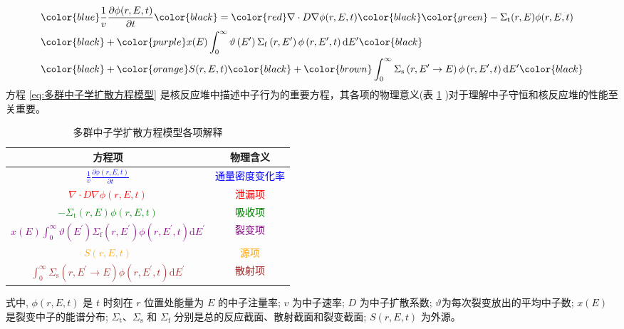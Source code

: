 \documentclass{Sichuan Normal University}
\begin{document}
\begin{equation}
    \begin{aligned}
    & \color{blue}\frac{1}{v} \frac{\partial \phi(r, E, t)}{\partial t} \color{black}= \color{red}\nabla \cdot D \nabla \phi(r, E, t) \color{black} \color{green}- \Sigma_{\mathrm{t}}(r, E) \phi(r, E, t)\\
    & \color{black}+ \color{purple}x(E) \int_0^{\infty} \vartheta\left(E^{\prime}\right) \Sigma_{\mathrm{f}}\left(r, E^{\prime}\right) \phi\left(r, E^{\prime}, t\right) \mathrm{d} E^{\prime} \color{black} \\
    & \color{black}+\color{orange} S(r, E, t) \color{black}+ \color{brown}\int_0^{\infty} \Sigma_{\mathrm{s}}\left(r, E^{\prime} \rightarrow E\right) \phi\left(r, E^{\prime}, t\right) \mathrm{d} E^{\prime} \color{black}
    \end{aligned}
    \label{eq:多群中子学扩散方程模型}
    \end{equation}
方程 \eqref{eq:多群中子学扩散方程模型} 是核反应堆中描述中子行为的重要方程，其各项的物理意义(表 \ref{tab:terms_explanation} )对于理解中子守恒和核反应堆的性能至关重要。
\begin{table}[H]
    \centering
    \begin{tabular}{|c|c|}
    \toprule
    \textbf{方程项} & \textbf{物理含义} \\    
    \midrule
    \textcolor{blue}{\(\frac{1}{v} \frac{\partial \phi(r, E, t)}{\partial t}\)} & \textcolor{blue}{通量密度变化率} \\
    \textcolor{red}{\(\nabla \cdot D \nabla \phi(r, E, t)\)} &  \textcolor{red}{泄漏项} \\
    \textcolor{green}{\(- \Sigma_{\mathrm{t}}(r, E) \phi(r, E, t)\)} &  \textcolor{green}{吸收项} \\
    \textcolor{purple}{\(x(E) \int_0^{\infty} \vartheta\left(E^{\prime}\right) \Sigma_{\mathrm{f}}\left(r, E^{\prime}\right) \phi\left(r, E^{\prime}, t\right) \mathrm{d} E^{\prime}\)} & \textcolor{purple}{裂变项} \\
    \textcolor{orange}{\(S(r, E, t)\)} & \textcolor{orange}{源项} \\
    \textcolor{brown}{\(\int_0^{\infty} \Sigma_{\mathrm{s}}\left(r, E^{\prime} \rightarrow E\right) \phi\left(r, E^{\prime}, t\right) \mathrm{d} E^{\prime}\)} & \textcolor{brown}{散射项} \\
    \bottomrule
    \end{tabular}
    \caption{多群中子学扩散方程模型各项解释}
    \label{tab:terms_explanation}
    \end{table}
式中, $\phi(r, E, t)$ 是 $t$ 时刻在 $r$ 位置处能量为 $E$ 的中子注量率; $v$ 为中子速率; $D$ 为中子扩散系数; $\vartheta$为每次裂变放出的平均中子数; $x(E)$ 是裂变中子的能谱分布; $\Sigma_{\mathrm{t}} 、 \Sigma_{\mathrm{s}}$ 和 $\Sigma_{\mathrm{f}}$ 分别是总的反应截面、散射截面和裂变截面; $S(r, E, t)$ 为外源。
\end{document}
